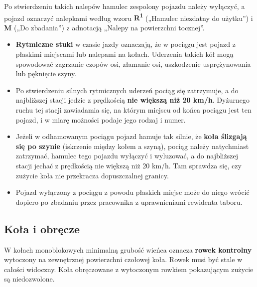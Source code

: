 Po stwierdzeniu takich nalepów hamulec zespolony pojazdu należy wyłączyć, a pojazd oznaczyć nalepkami według wzoru \textbf{R\textsuperscript{1}} („Hamulec niezdatny do użytku”) i \textbf{M} („Do zbadania”) z adnotacją „Nalepy na powierzchni tocznej”.

\begin{tcolorbox}[colback=red!5!white,colframe=red!75!black,title=Rytmiczne stuki i ślizganie kół (Ir-1 § 76)]
	\begin{itemize}
		\item \textbf{Rytmiczne stuki} w czasie jazdy oznaczają, że w pociągu jest pojazd z płaskimi miejscami lub nalepami na kołach. Uderzenia takich kół mogą spowodować zagrzanie czopów osi, złamanie osi, uszkodzenie usprężynowania lub pęknięcie szyny.
		\item Po stwierdzeniu silnych rytmicznych uderzeń pociąg się zatrzymuje, a do najbliższej stacji jedzie z prędkością \textbf{nie większą niż 20 km/h}. Dyżurnego ruchu tej stacji zawiadamia się, na którym miejscu od końca pociągu jest ten pojazd, i w miarę możności podaje jego rodzaj i numer.
		\item Jeżeli w odhamowanym pociągu pojazd hamuje tak silnie, że \textbf{koła ślizgają się po szynie} (iskrzenie między kołem a szyną), pociąg należy natychmiast zatrzymać, hamulec tego pojazdu wyłączyć i wyluzować, a do najbliższej stacji jechać z prędkością nie większą niż 20 km/h. Tam sprawdza się, czy zużycie koła nie przekracza dopuszczalnej granicy.
		\item Pojazd wyłączony z pociągu z powodu płaskich miejsc może do niego wrócić dopiero po zbadaniu przez pracownika z uprawnieniami rewidenta taboru.
	\end{itemize}
\end{tcolorbox}

\subsection*{Koła i obręcze}

W kołach monoblokowych minimalną grubość wieńca oznacza \textbf{rowek kontrolny} wytoczony na zewnętrznej powierzchni czołowej koła. Rowek musi być stale w całości widoczny. Koła obręczowane z wytoczonym rowkiem pokazującym zużycie są niedozwolone.


